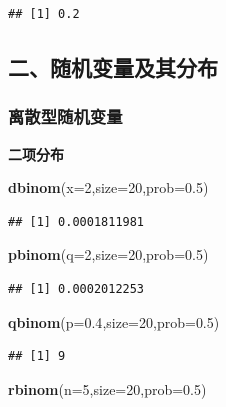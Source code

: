 \documentclass[]{article}
\newenvironment{Shaded}{\begin{snugshade}}{\end{snugshade}}
\newcommand{\KeywordTok}[1]{\textcolor[rgb]{0.13,0.29,0.53}{\textbf{{#1}}}}
\newcommand{\DataTypeTok}[1]{\textcolor[rgb]{0.13,0.29,0.53}{{#1}}}
\newcommand{\DecValTok}[1]{\textcolor[rgb]{0.00,0.00,0.81}{{#1}}}
\newcommand{\FloatTok}[1]{\textcolor[rgb]{0.00,0.00,0.81}{{#1}}}
\newcommand{\NormalTok}[1]{{#1}}
\begin{document}
\begin{verbatim}
## [1] 0.2
\end{verbatim}

\subsection{二、随机变量及其分布}

\subsubsection{离散型随机变量}

\textbf{二项分布}

\begin{Shaded}
\begin{Highlighting}[]
\KeywordTok{dbinom}\NormalTok{(}\DataTypeTok{x=}\DecValTok{2}\NormalTok{,}\DataTypeTok{size=}\DecValTok{20}\NormalTok{,}\DataTypeTok{prob=}\FloatTok{0.5}\NormalTok{)}
\end{Highlighting}
\end{Shaded}

\begin{verbatim}
## [1] 0.0001811981
\end{verbatim}

\begin{Shaded}
\begin{Highlighting}[]
\KeywordTok{pbinom}\NormalTok{(}\DataTypeTok{q=}\DecValTok{2}\NormalTok{,}\DataTypeTok{size=}\DecValTok{20}\NormalTok{,}\DataTypeTok{prob=}\FloatTok{0.5}\NormalTok{)}
\end{Highlighting}
\end{Shaded}

\begin{verbatim}
## [1] 0.0002012253
\end{verbatim}

\begin{Shaded}
\begin{Highlighting}[]
\KeywordTok{qbinom}\NormalTok{(}\DataTypeTok{p=}\FloatTok{0.4}\NormalTok{,}\DataTypeTok{size=}\DecValTok{20}\NormalTok{,}\DataTypeTok{prob=}\FloatTok{0.5}\NormalTok{)}
\end{Highlighting}
\end{Shaded}

\begin{verbatim}
## [1] 9
\end{verbatim}

\begin{Shaded}
\begin{Highlighting}[]
\KeywordTok{rbinom}\NormalTok{(}\DataTypeTok{n=}\DecValTok{5}\NormalTok{,}\DataTypeTok{size=}\DecValTok{20}\NormalTok{,}\DataTypeTok{prob=}\FloatTok{0.5}\NormalTok{)}
\end{Highlighting}
\end{Shaded}
\end{document}
